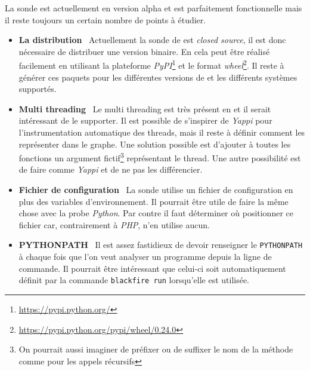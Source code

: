 La sonde \Python est actuellement en version alpha et est parfaitement fonctionnelle mais il reste toujours un certain nombre de points à étudier.

\begin{itemize}
\item \textbf{La distribution}\;~ Actuellement la sonde de \Blackfire est \emph{closed source}, il est donc nécessaire de distribuer une version binaire. En \Python cela peut être réalisé facilement en utilisant la plateforme \emph{PyPI}\footnote{\url{https://pypi.python.org/}} et le format \emph{wheel}\footnote{\url{https://pypi.python.org/pypi/wheel/0.24.0}}. Il reste à générer ces paquets pour les différentes versions de \Python et les différents systèmes supportés.
\item \textbf{Multi threading}\;~ Le multi threading est très présent en \Python et il serait intéressant de le supporter. Il est possible de s'inspirer de \emph{Yappi} pour l'instrumentation automatique des threads, mais il reste à définir comment les représenter dans le graphe. Une solution possible est d'ajouter à toutes les fonctions un argument fictif\footnote{On pourrait aussi imaginer de préfixer ou de suffixer le nom de la méthode comme pour les appels récursifs} représentant le thread. Une autre possibilité est de faire comme \emph{Yappi} et de ne pas les différencier.
\item \textbf{Fichier de configuration}\;~ La sonde \PHP utilise un fichier de configuration en plus des variables d'environnement. Il pourrait être utile de faire la même chose avec la probe \emph{Python}. Par contre il faut déterminer où positionner ce fichier car, contrairement à \emph{PHP}, \Python n'en utilise aucun.
\item \textbf{PYTHONPATH}\;~ Il est assez fastidieux de devoir renseigner le \verb|PYTHONPATH| à chaque fois que l'on veut analyser un programme depuis la ligne de commande. Il pourrait être intéressant que celui-ci soit automatiquement définit par la commande \verb|blackfire run| lorsqu'elle est utilisée.
\end{itemize}
  	
  	
